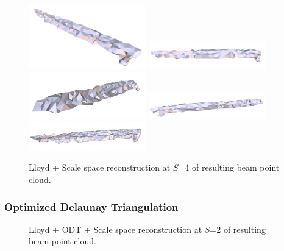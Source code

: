 \documentclass[12pt]{drexelthesis}
\let\Oldsubsubsection\subsubsection
\renewcommand{\subsubsection}{\FloatBarrier\Oldsubsubsection}
\begin{document}
\begin{figure}[!ht]
	\centering
		\includegraphics[width=2in]{real-lab-scans/meshed/optimized/scalespace4lloyd00.png}
		\includegraphics[width=2in]{real-lab-scans/meshed/optimized/scalespace4lloyd01.png}
		\includegraphics[width=2in]{real-lab-scans/meshed/optimized/scalespace4lloyd02.png}
		\includegraphics[width=2in]{real-lab-scans/meshed/optimized/scalespace4lloyd03.png}
		\includegraphics[width=2in]{real-lab-scans/meshed/optimized/scalespace4lloyd04.png}
		\caption[Lloyd + Scale space reconstruction at $S$=4 of segmented LiDAR data]{\centering Lloyd + Scale space reconstruction at $S$=4 of resulting beam point cloud.}
	\label{lidar:scalespace4lloyd}
\end{figure}


\subsubsection{Optimized Delaunay Triangulation}

\begin{figure}[!ht]
	\centering
		\caption[Lloyd + ODT +Scale space reconstruction at $S$=2 of segmented LiDAR data]{\centering Lloyd + ODT + Scale space reconstruction at $S$=2 of resulting beam point cloud.}
	\label{lidar:scalespace2lloydodt}
\end{figure}
\end{document}
